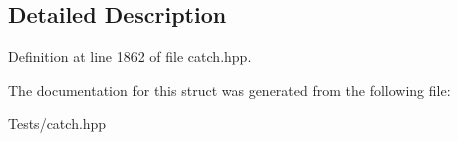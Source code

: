 \subsection{Detailed Description}


Definition at line 1862 of file catch.\+hpp.



The documentation for this struct was generated from the following file\+:\begin{DoxyCompactItemize}
\item 
Tests/catch.\+hpp\end{DoxyCompactItemize}
